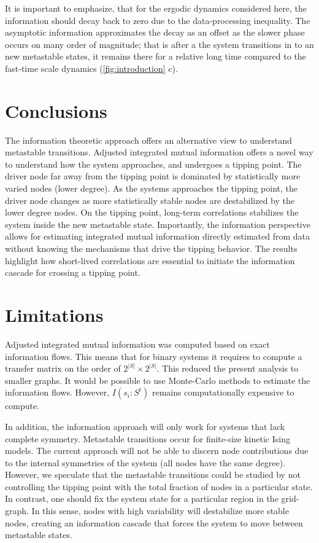 \documentclass[a4paper, 11pt, twocolumn]{article}
\begin{document}
It   is important  to  emphasize,  that  for  the  ergodic  dynamics
considered here,  the information should decay  back to zero
due  to  the   data-processing  inequality.  The  asymptotic
information  approximates  the decay  as  an  offset as  the
slower  phase occurs  on many  order of  magnitude; that  is
after  a the  system  transitions in  to  an new  metastable
states, it remains  there for a relative  long time compared
to the  fast-time scale dynamics  (\cref{fig:introduction}
c).

\section{Conclusions}
\label{sec:org7971cd6}
The  information theoretic  approach  offers an  alternative
view   to   understand  metastable   transitions.   Adjusted
integrated  mutual   information  offers  a  novel   way  to
understand how the system  approaches, and undergoes a tipping
point. The  driver node far  away from the tipping  point is
dominated by statistically more varied nodes (lower degree).
As the systems approaches the tipping point, the driver node
changes as more statistically  stable nodes are destabilized
by the lower  degree nodes. On the  tipping point, long-term
correlations stabilizes the system inside the new metastable
state. Importantly,  the information perspective  allows for
estimating integrated  mutual information  directly
estimated  from data  without  knowing  the mechanisms  that
drive  the  tipping  behavior.  The  results  highlight  how
short-lived  correlations  are  essential  to  initiate  the
information cascade for crossing a tipping point.

\section{Limitations}
\label{sec:org26f073f}
Adjusted integrated mutual information was computed based on
exact information flows. This  means that for binary systems
it requires  to compute  a transfer matrix  on the  order of
$2^{|S|} \times  2^{|S|}$. This  reduced the present  analysis to
smaller  graphs. It  would  be possible  to use  Monte-Carlo
methods to estimate the information flows. However, $I(s_i :
S^t)$ remains computationally expensive to compute.

In  addition, the  information approach  will only  work for
systems that lack  complete symmetry. Metastable transitions
occur  for finite-size  kinetic  Ising  models. The  current
approach will not be able  to discern node contributions due
to the internal symmetries of the system (all nodes have the
same  degree). However,  we  speculate  that the  metastable
transitions could be studied  by not controlling the tipping
point  with the  total  fraction of  nodes  in a  particular
state. In  contrast, one should  fix the system state  for a
particular region  in the  grid-graph. In this  sense, nodes
with high  variability will  destabilize more  stable nodes,
creating an  information cascade  that forces the  system to
move between metastable states.
\end{document}
